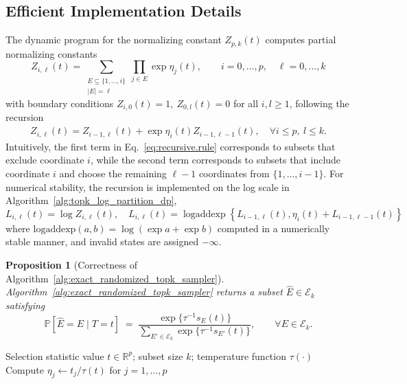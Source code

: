\documentclass[12pt]{article}
\newcommand{\nbracket}[1]{\left( #1 \right)}
\newtheorem{proposition}{Proposition}[section]
\newcommand{\Pp}{{\mathbb{P}}}
\begin{document}
\begin{appendices}





\section{Efficient Implementation Details}
\label{app:effcient}

The dynamic program for the normalizing constant $Z_{p,k}(t)$ computes partial normalizing constants
\[
  Z_{i,\ell}(t)
  =
  \sum_{\substack{
      E\subseteq \{1,\ldots,i\}\\
      |E|=\ell
  }}
  \prod_{j\in E}\exp\eta_j(t),
  \qquad
  i=0,\ldots,p,\quad \ell=0,\ldots,k
\] with boundary conditions $Z_{i,0}(t)=1, \ Z_{0,l}(t) = 0$ for all $i, l \geq 1$, following the recursion 
\begin{align}\label{eq:recursive.rule}
  Z_{i,\ell}(t)
  =
  Z_{i-1,\ell}(t)
  +
  \exp\eta_i (t) Z_{i-1,\ell-1}(t), \quad \forall i\leq p, \  l\leq k.
\end{align}
Intuitively, the first term in Eq.~\eqref{eq:recursive.rule} corresponds to subsets that exclude coordinate $i$, while
the second term corresponds to subsets that include coordinate $i$ and
choose the remaining $\ell-1$ coordinates from $\{1,\ldots,i-1\}$. For numerical stability, the recursion is implemented on the log scale in Algorithm~\ref{alg:topk_log_partition_dp},
\[ L_{i,\ell}(t)=\log Z_{i,\ell}(t), \quad
  L_{i,\ell}(t)
  =
  \operatorname{logaddexp}
  \left\{
    L_{i-1,\ell}(t),
    \eta_i(t)+L_{i-1,\ell-1}(t)
  \right\}
\] where $\mathrm{logaddexp}(a,b) = \log(\exp a + \exp b)$ computed in a numerically stable manner, and invalid states are assigned $-\infty$.


\begin{proposition}[Correctness of Algorithm~\ref{alg:exact_randomized_topk_sampler}]
\label{prop:seq_sampling_correct}
Algorithm~\ref{alg:exact_randomized_topk_sampler} returns a subset $\widehat{E} \in \mathcal{E}_k$ satisfying
\[
  \Pp[\widehat{E} = E \mid T = t]
  \;=\;
  \frac{\exp\{\tau^{-1}s_E(t)\}}{\sum_{E' \in \mathcal{E}_k} \exp\{\tau^{-1}s_{E'}(t)\}},
  \qquad\forall E \in \mathcal{E}_k.
\]
\end{proposition}




\begin{algorithm}[H]
\caption{\textsc{TopKLogPartitionDP}: log-partition dynamic program}
\label{alg:topk_log_partition_dp}
\begin{algorithmic}[1]
\Require Selection statistic value $t\in\mathbb R^p$; subset size $k$; temperature function $\tau(\cdot)$
\State Compute $\eta_j \gets t_j/\tau(t)$ for $j=1,\ldots,p$


\end{algorithmic}
\end{algorithm}
\end{appendices}
\end{document}
